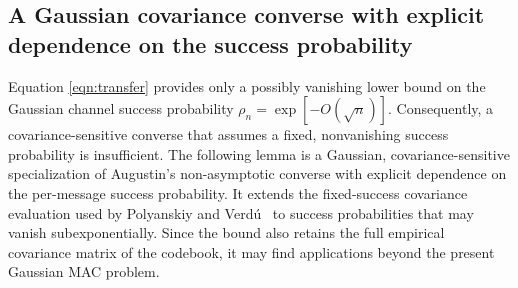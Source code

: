 \documentclass[11pt,onecolumn]{IEEEtran}
\begin{document}
\subsection{A Gaussian covariance converse with explicit  dependence on the success probability} \label{sec:cov_converse}
Equation \eqref{eqn:transfer} provides only a possibly vanishing lower bound on the Gaussian channel success probability $\rho_n=\exp[ - O(\sqrt {n })]$. Consequently, a covariance-sensitive converse that assumes a fixed, nonvanishing success probability is insufficient. The following lemma is a Gaussian, covariance-sensitive specialization of Augustin's non-asymptotic converse \cite{Augustin1966} with explicit dependence on the per-message success probability. It extends the fixed-success covariance evaluation used by Polyanskiy and Verd\'u~\cite[Theorem~19]{PolVerdu14} to success probabilities that may vanish subexponentially. Since the bound also retains the full empirical covariance matrix of the codebook, it may find applications beyond the present Gaussian MAC problem.
\end{document}
